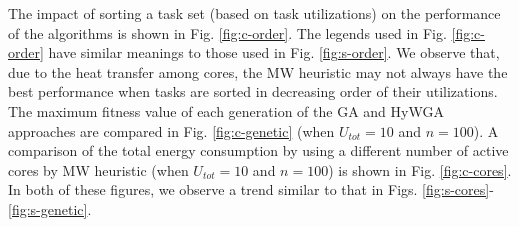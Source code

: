 \documentclass[conference]{IEEEtran}
\begin{document}



The impact of sorting a task set (based on task utilizations) on the performance of the algorithms is shown in Fig. \ref{fig:c-order}.
The legends used in Fig. \ref{fig:c-order} have similar meanings to those used in Fig. \ref{fig:s-order}. We observe that, due to the heat transfer among cores, the MW heuristic may not always have the best performance when tasks are sorted in decreasing order of their utilizations.
The maximum fitness value of each generation of the GA and HyWGA approaches are compared in Fig. \ref{fig:c-genetic} (when $U_{tot}=10$ and $n=100$). 
A comparison of the total energy consumption by using a different number of active cores by MW heuristic (when $U_{tot}=10$ and $n=100$)
is shown in Fig. \ref{fig:c-cores}. In both of these figures, we observe a  trend similar to that in  Figs. \ref{fig:s-cores}-\ref{fig:s-genetic}.
\end{document}
